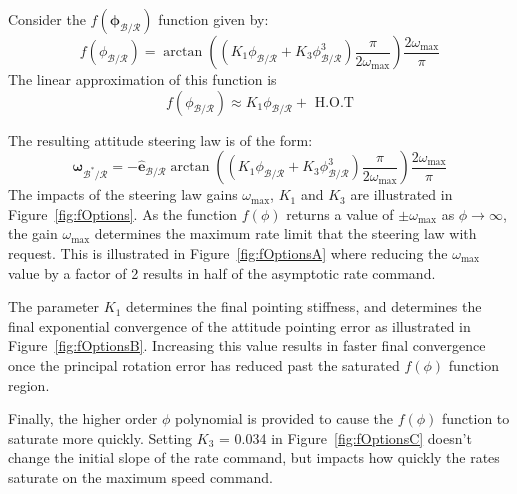 \documentclass[]{BasiliskReportMemo}
\begin{document}
Consider the $f(\bm \phi_{\mathcal{B}/\mathcal{R}})$ function given by:
\begin{equation}
	\label{eq:MS:19}
	f(\phi_{\mathcal{B}/\mathcal{R}}) = 
	\arctan \left(
		(K_{1}\phi_{\mathcal{B}/\mathcal{R}} + K_{3} \phi_{\mathcal{B}/\mathcal{R}}^{3}) \frac{\pi}{2 \omega_{\text{max}}}
	\right) \frac{2 \omega_{\text{max}}}{\pi}
\end{equation}
The linear approximation of this function is
\begin{equation}
	f(\phi_{\mathcal{B}/\mathcal{R}}) \approx K_{1} \phi_{\mathcal{B}/\mathcal{R}} + \text{ H.O.T}
\end{equation}

The resulting attitude steering law is of the form:
\begin{equation}
	\label{eq:MS:20}
	\bm\omega_{{\mathcal{B}}^{\ast}/\mathcal{R}} = -  \hat{\bm e}_{\mathcal{B}/\mathcal{R}} 
	\arctan \left(
		(K_{1}\phi_{\mathcal{B}/\mathcal{R}} + K_{3} \phi_{\mathcal{B}/\mathcal{R}}^{3}) \frac{\pi}{2 \omega_{\text{max}}}
	\right) \frac{2 \omega_{\text{max}}}{\pi}
\end{equation}
The impacts of the steering law gains $\omega_{\text{max}}$, $K_{1}$ and $K_{3}$ are illustrated in Figure~\ref{fig:fOptions}.  As the function $f(\phi)$  returns a value of $\pm \omega_{\text{max}}$ as $\phi\rightarrow \infty$, the gain $\omega_{\text{max}}$ determines the maximum rate limit that the steering law with request.  This is illustrated in Figure~\ref{fig:fOptionsA} where reducing the $\omega_{\text{max}}$ value by a factor of 2 results in half of the asymptotic rate command.  

The parameter $K_{1}$ determines the final  pointing stiffness, and determines the final exponential convergence of the attitude pointing error as illustrated in Figure~\ref{fig:fOptionsB}.  Increasing this value results in faster final convergence once the principal rotation error has reduced past the saturated $f(\phi)$ function region.  

Finally, the higher order $\phi$ polynomial is provided to cause the $f(\phi)$ function to saturate more quickly.  Setting $K_{3} $ = 0.034 in Figure~\ref{fig:fOptionsC} doesn't change the initial slope of the rate command, but impacts how quickly the rates saturate on the maximum speed command.
\end{document}
